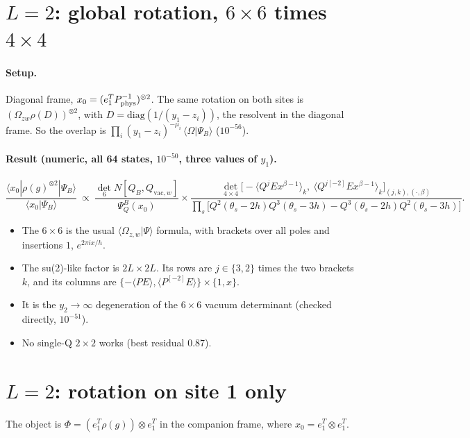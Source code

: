 \documentclass[11pt]{article}
\newcommand{\bra}[1]{\langle #1|}
\newcommand{\ket}[1]{|#1\rangle}
\newcommand{\Om}{\Omega}
\newcommand{\vac}{\mathrm{vac}}
\begin{document}
\section{$L=2$: global rotation, $6\times6$ times $4\times4$}

\paragraph{Setup.} Diagonal frame, $x_0=(e_1^TP_{\rm phys}^{-1})^{\otimes2}$. The same rotation on both sites is $(\Om_{zw}\rho(D))^{\otimes2}$, with $D=\mathrm{diag}(1/(y_1-z_i))$, the resolvent in the diagonal frame. So the overlap is $\prod_i(y_1-z_i)^{-\mu_i}\,\langle\Om|\Psi_B\rangle$ ($10^{-56}$).

\paragraph{Result (numeric, all 64 states, $10^{-50}$, three values of $y_1$).}
\[
\frac{\bra{x_0}\rho(g)^{\otimes2}\ket{\Psi_B}}{\langle x_0|\Psi_B\rangle}\ \propto\ \frac{\det_6N[Q_B,Q_{\vac,w}]}{\Psi_Q^B(x_0)}\times\frac{\det_{4\times4}\big[-\langle Q^jEx^{\beta-1}\rangle_k,\ \langle Q^{j[-2]}Ex^{\beta-1}\rangle_k\big]_{(j,k),(\cdot,\beta)}}{\prod_s\big[Q^2(\theta_s-2h)Q^3(\theta_s-3h)-Q^3(\theta_s-2h)Q^2(\theta_s-3h)\big]}.
\]
\begin{itemize}
\item The $6\times6$ is the usual $\langle\Om_{z,w}|\Psi\rangle$ formula, with brackets over all poles and insertions $1$, $e^{2\pi ix/h}$.
\item The su(2)-like factor is $2L\times2L$. Its rows are $j\in\{3,2\}$ times the two brackets $k$, and its columns are $\{-\langle PE\rangle,\langle P^{[-2]}E\rangle\}\times\{1,x\}$.
\item It is the $y_2\to\infty$ degeneration of the $6\times6$ vacuum determinant (checked directly, $10^{-51}$).
\item No single-Q $2\times2$ works (best residual 0.87).
\end{itemize}

\section{$L=2$: rotation on site 1 only}

The object is $\Phi=(e_1^T\rho(g))\otimes e_1^T$ in the companion frame, where $x_0=e_1^T\otimes e_1^T$.
\end{document}

